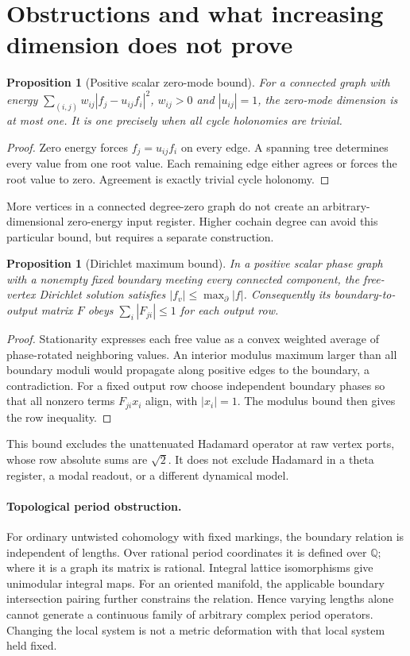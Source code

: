 \documentclass[11pt]{article}
\newtheorem{proposition}[theorem]{Proposition}
\theoremstyle{definition}
\begin{document}
\section{Obstructions and what increasing dimension does not prove}
\label{sec:obstructions}
\begin{proposition}[Positive scalar zero-mode bound]\label{prop:zerobound}
For a connected graph with energy
$\sum_{(i,j)}w_{ij}|f_j-u_{ij}f_i|^2$, $w_{ij}>0$ and $|u_{ij}|=1$,
the zero-mode dimension is at most one. It is one precisely when all
cycle holonomies are trivial.
\end{proposition}
\begin{proof}
Zero energy forces $f_j=u_{ij}f_i$ on every edge. A spanning tree
determines every value from one root value. Each remaining edge either
agrees or forces the root value to zero. Agreement is exactly trivial
cycle holonomy.
\end{proof}
More vertices in a connected degree-zero graph do not create an
arbitrary-dimensional zero-energy input register. Higher cochain degree
can avoid this particular bound, but requires a separate construction.

\begin{proposition}[Dirichlet maximum bound]\label{prop:maxbound}
In a positive scalar phase graph with a nonempty fixed boundary meeting
every connected component, the free-vertex Dirichlet solution satisfies
$|f_v|\le\max_{\partial}|f|$.
Consequently its boundary-to-output matrix $F$ obeys
$\sum_i|F_{ji}|\le1$ for each output row.
\end{proposition}
\begin{proof}
Stationarity expresses each free value as a convex weighted average of
phase-rotated neighboring values. An interior modulus maximum larger
than all boundary moduli would propagate along positive edges to the
boundary, a contradiction. For a fixed output row choose independent
boundary phases so that all nonzero terms $F_{ji}x_i$ align, with
$|x_i|=1$. The modulus bound then gives the row inequality.
\end{proof}
This bound excludes the unattenuated Hadamard operator at raw vertex
ports, whose row absolute sums are $\sqrt2$. It does not exclude
Hadamard in a theta register, a modal readout, or a different dynamical
model.

\paragraph{Topological period obstruction.}
For ordinary untwisted cohomology with fixed markings, the boundary
relation is independent of lengths. Over rational period coordinates
it is defined over $\mathbb Q$; where it is a graph its matrix is rational.
Integral lattice isomorphisms give unimodular integral maps. For an
oriented manifold, the applicable boundary intersection pairing further
constrains the relation. Hence varying lengths alone cannot generate a
continuous family of arbitrary complex period operators.
Changing the local system is not a metric deformation with that local
system held fixed.
\end{document}
